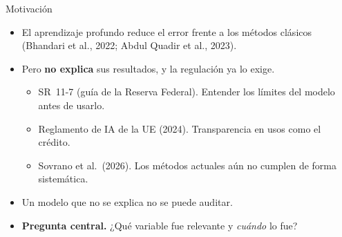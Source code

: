 \documentclass{beamer}
\begin{document}
\begin{frame}{Motivación}
    \begin{itemize}
        \item El aprendizaje profundo reduce el error frente a los
        métodos clásicos (Bhandari et al., 2022; Abdul Quadir et al., 2023).
        \vspace{0.2cm}
        \item Pero \textbf{no explica} sus resultados, y la regulación
        ya lo exige.
        \begin{itemize}
            \item SR~11-7 (guía de la Reserva Federal). Entender los
            límites del modelo antes de usarlo.
            \item Reglamento de IA de la UE (2024). Transparencia en
            usos como el crédito.
            \item Sovrano et al.\ (2026). Los métodos actuales aún no
            cumplen de forma sistemática.
        \end{itemize}
        \vspace{0.2cm}
        \item Un modelo que no se explica no se puede auditar.
        \vspace{0.35cm}
        \item \textbf{Pregunta central.} ¿Qué variable fue relevante y
        \emph{cuándo} lo fue?
    \end{itemize}
\end{frame}
\end{document}
